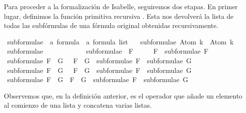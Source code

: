 \begin{isabellebody}
\begin{isamarkuptext}
  Para proceder a la formalización de Isabelle, seguiremos dos etapas. 
  En primer lugar, definimos la función primitiva recursiva 
  . Esta nos devolverá la lista de todas las 
  subfórmulas de una fórmula original obtenidas recursivamente.%
\end{isamarkuptext}\isamarkuptrue%
\isamarkupfalse%
\ subformulae\ {\isacharcolon}{\isacharcolon}\ {\isachardoublequoteopen}{\isacharprime}a\ formula\ {\isasymRightarrow}\ {\isacharprime}a\ formula\ list{\isachardoublequoteclose}\ \isanewline
\ \ {\isachardoublequoteopen}subformulae\ {\isacharparenleft}Atom\ k{\isacharparenright}\ {\isacharequal}\ {\isacharbrackleft}Atom\ k{\isacharbrackright}{\isachardoublequoteclose}\ \isanewline
{\isacharbar}\ {\isachardoublequoteopen}subformulae\ {\isasymbottom}\ \ \ \ \ \ \ \ {\isacharequal}\ {\isacharbrackleft}{\isasymbottom}{\isacharbrackright}{\isachardoublequoteclose}\ \isanewline
{\isacharbar}\ {\isachardoublequoteopen}subformulae\ {\isacharparenleft}\isactrlbold {\isasymnot}\ F{\isacharparenright}\ \ \ \ {\isacharequal}\ {\isacharparenleft}\isactrlbold {\isasymnot}\ F{\isacharparenright}\ {\isacharhash}\ subformulae\ F{\isachardoublequoteclose}\ \isanewline
{\isacharbar}\ {\isachardoublequoteopen}subformulae\ {\isacharparenleft}F\ \isactrlbold {\isasymand}\ G{\isacharparenright}\ \ {\isacharequal}\ {\isacharparenleft}F\ \isactrlbold {\isasymand}\ G{\isacharparenright}\ {\isacharhash}\ subformulae\ F\ {\isacharat}\ subformulae\ G{\isachardoublequoteclose}\ \isanewline
{\isacharbar}\ {\isachardoublequoteopen}subformulae\ {\isacharparenleft}F\ \isactrlbold {\isasymor}\ G{\isacharparenright}\ \ {\isacharequal}\ {\isacharparenleft}F\ \isactrlbold {\isasymor}\ G{\isacharparenright}\ {\isacharhash}\ subformulae\ F\ {\isacharat}\ subformulae\ G{\isachardoublequoteclose}\isanewline
{\isacharbar}\ {\isachardoublequoteopen}subformulae\ {\isacharparenleft}F\ \isactrlbold {\isasymrightarrow}\ G{\isacharparenright}\ {\isacharequal}\ {\isacharparenleft}F\ \isactrlbold {\isasymrightarrow}\ G{\isacharparenright}\ {\isacharhash}\ subformulae\ F\ {\isacharat}\ subformulae\ G{\isachardoublequoteclose}%
\begin{isamarkuptext}%
Observemos que, en la definición anterior, \isa{{\isacharhash}} es el operador que 
  añade un elemento al comienzo de una lista y \isa{{\isacharat}} concatena varias 
  listas. 


\end{isamarkuptext}
\end{isabellebody}
